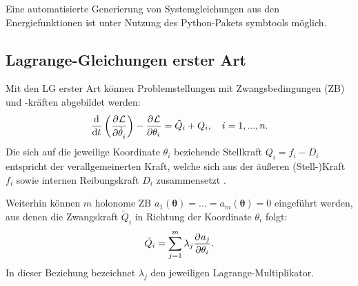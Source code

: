 Eine automatisierte Generierung von Systemgleichungen aus den Energiefunktionen ist unter Nutzung des Python-Pakets symbtools \cite{symbtools} möglich.

\subsection{Lagrange-Gleichungen erster Art}
\label{sec:Lagrange1_theory}

Mit den LG erster Art können Problemstellungen mit Zwangsbedingungen (ZB) und -kräften abgebildet werden:
\begin{equation}
	\label{eq:lagrange1}
	\frac{\mathrm{d}^{}}{\mathrm{d}{t}^{}}\left(\frac{\partial^{}\mathcal{L}}{\partial{\dot{\theta}_i}^{}} \right) - \frac{\partial^{}\mathcal{L}}{\partial{\theta_i}^{}} = \tilde{Q}_i + Q_i, \quad i = 1, ..., n.
\end{equation}
Die sich auf die jeweilige Koordinate $\theta_i$ beziehende Stellkraft $Q_i = f_i - D_i$ entspricht der verallgemeinerten Kraft, welche sich aus der äußeren (Stell-)Kraft $f_i$ sowie internen Reibungskraft $D_i$ zusammensetzt \cite[S. 49]{Lagrange}.

Weiterhin können $m$ holonome ZB $a_1(\boldsymbol{\theta}) = ... = a_m(\boldsymbol{\theta}) = 0$ eingeführt werden, aus denen die Zwangskraft $\tilde{Q}_i$ in Richtung der Koordinate $\theta_i$ folgt:
\begin{equation}
	\tilde{Q}_i = \sum_{j = 1}^m \lambda_j \frac{\partial^{}a_j}{\partial{\theta_i}^{}}.
\end{equation}
In dieser Beziehung bezeichnet $\lambda_j$ den jeweiligen Lagrange-Multiplikator.

